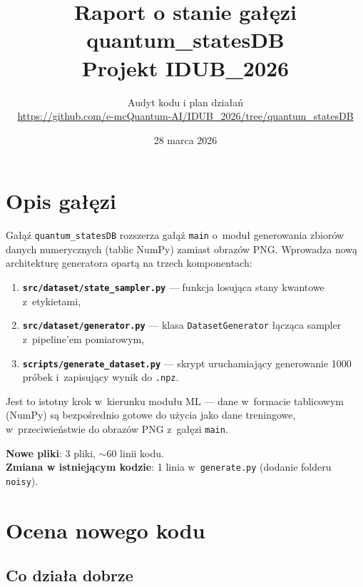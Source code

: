\documentclass[12pt,a4paper]{article}
\title{
    \vspace{-1cm}
    {\Large Raport o stanie gałęzi}\\[0.5em]
    {\LARGE\bfseries quantum\_statesDB}\\[0.3em]
    {\large Projekt IDUB\_2026}
}
\author{
    Audyt kodu i plan działań\\[0.3em]
    \small \url{https://github.com/e-mcQuantum-AI/IDUB_2026/tree/quantum_statesDB}
}
\date{28 marca 2026}
\begin{document}
\maketitle
\thispagestyle{fancy}
\tableofcontents
\newpage

\section{Opis gałęzi}
\label{sec:opis}

Gałąź \texttt{quantum\_statesDB} rozszerza gałąź \texttt{main} o~moduł generowania zbiorów danych numerycznych (tablic NumPy) zamiast obrazów PNG. Wprowadza nową architekturę generatora opartą na trzech komponentach:

\begin{enumerate}
    \item \textbf{\texttt{src/dataset/state\_sampler.py}} --- funkcja losująca stany kwantowe z~etykietami,
    \item \textbf{\texttt{src/dataset/generator.py}} --- klasa \texttt{DatasetGenerator} łącząca sampler z~pipeline'em pomiarowym,
    \item \textbf{\texttt{scripts/generate\_dataset.py}} --- skrypt uruchamiający generowanie 1000 próbek i~zapisujący wynik do \texttt{.npz}.
\end{enumerate}

Jest to istotny krok w~kierunku modułu ML --- dane w~formacie tablicowym (NumPy) są bezpośrednio gotowe do użycia jako dane treningowe, w~przeciwieństwie do obrazów PNG z~gałęzi \texttt{main}.

\noindent\textbf{Nowe pliki}: 3 pliki, $\sim$60 linii kodu.\\
\textbf{Zmiana w istniejącym kodzie}: 1 linia w~\texttt{generate.py} (dodanie folderu \texttt{noisy}).

\section{Ocena nowego kodu}

\subsection{Co działa dobrze}
\end{document}
